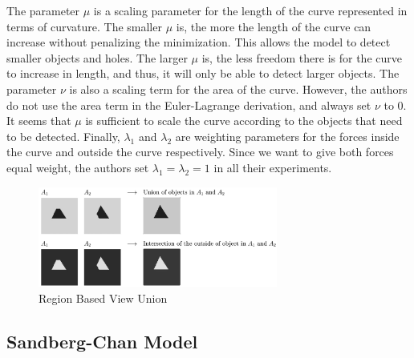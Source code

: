 \documentclass[10pt,twocolumn,letterpaper]{article}
\begin{document}
The parameter $\mu$ is a scaling parameter for the length of the curve represented in terms of curvature. The smaller $\mu$ is, the more the length of the curve
can increase without penalizing the minimization. This allows the model to detect smaller objects and holes. The larger $\mu$ is, the less freedom there is for
the curve to increase in length, and thus, it will only be able to detect larger objects. The parameter $\nu$ is also a scaling term for the area of the curve.
However, the authors do not use the area term in the Euler-Lagrange derivation, and always set $\nu$ to 0. It seems that $\mu$ is sufficient to scale the curve
according to the objects that need to be detected. Finally, $\lambda_{1}$ and $\lambda_{2}$ are weighting parameters for the forces inside the curve and
outside the curve respectively. Since we want to give both forces equal weight, the authors set $\lambda_{1} = \lambda_{2} = 1$ in all their experiments.


\begin{figure}[t]
\centering
\includegraphics[width=0.7\textwidth]{logicop.png}
\caption{Region Based View Union}
\label{fig:logic-op}
\end{figure}


\subsection{Sandberg-Chan Model}
\label{sec:sandberg-chan}
\end{document}
